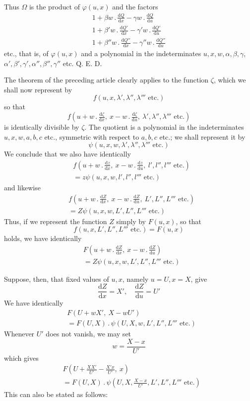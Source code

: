 Thus $\Omega$ is the product of $\varphi(u,x)$ and the factors
\[
\begin{gathered}
1+\beta w\, .\,\frac{\mathrm dQ}{\mathrm dx}-\gamma w\, .\,\frac{\mathrm dQ}{\mathrm du}\\
1+\beta'w\, .\,\frac{\mathrm dQ'}{\mathrm dx}-\gamma'w\, .\,\frac{\mathrm dQ'}{\mathrm du}\\
1+\beta''w\, .\,\frac{\mathrm dQ''}{\mathrm dx}-\gamma''w\, .\,\frac{\mathrm dQ''}{\mathrm du}
\end{gathered}
\]
etc., that is, of $\varphi(u,x)$ and a polynomial in the indeterminates $u,x,w,\alpha,\beta,\gamma$, $\alpha',\beta',\gamma',\alpha'',\beta'',\gamma''$ etc. Q. E. D.

The theorem of the preceding article clearly applies to the function $\zeta$, which we shall now represent by
\[
f(u,x,\lambda',\lambda'',\lambda'''\text{ etc.})
\]
so that
\[
f(u+w\, .\,\tfrac{\mathrm d\zeta}{\mathrm dx},\ x-w\, .\,\tfrac{\mathrm d\zeta}{\mathrm du},\ \lambda',\lambda'',\lambda'''\text{ etc.})
\]
is identically divisible by $\zeta$. The quotient is a polynomial in the indeterminates $u,x,w,a,b,c$ etc., symmetric with respect to $a,b,c$ etc.; we shall represent it by
\[
\psi(u,x,w,\lambda',\lambda'',\lambda'''\text{ etc.})
\]
We conclude that we also have identically
\[
\begin{aligned}
&f(u+w\, .\,\tfrac{\mathrm dz}{\mathrm dx},\ x-w\, .\,\tfrac{\mathrm dz}{\mathrm du},\ l',l'',l'''\text{ etc.})\\
&=z\psi(u,x,w,l',l'',l'''\text{ etc.})
\end{aligned}
\]
and likewise
\[
\begin{aligned}
&f(u+w\, .\,\tfrac{\mathrm dZ}{\mathrm dx},\ x-w\, .\,\tfrac{\mathrm dZ}{\mathrm du},\ L',L'',L'''\text{ etc.})\\
&=Z\psi(u,x,w,L',L'',L'''\text{ etc.})
\end{aligned}
\]
Thus, if we represent the function $Z$ simply by $F(u,x)$, so that
\[
f(u,x,L',L'',L'''\text{ etc.})=F(u,x)
\]
holds, we have identically
\[
\begin{aligned}
&F(u+w\, .\,\tfrac{\mathrm dZ}{\mathrm dx},\ x-w\, .\,\tfrac{\mathrm dZ}{\mathrm du})\\
&=Z\psi(u,x,w,L',L'',L'''\text{ etc.})
\end{aligned}
\]

Suppose, then, that fixed values of $u,x$, namely $u=U,x=X$, give
\[
\frac{\mathrm dZ}{\mathrm dx}=X',\quad\frac{\mathrm dZ}{\mathrm du}=U'
\]
We have identically
\[
\begin{aligned}
&F(U+wX',\ X-wU')\\
&=F(U,X)\, .\,\psi(U,X,w,L',L'',L'''\text{ etc.})
\end{aligned}
\]
Whenever $U'$ does not vanish, we may set
\[
w=\frac{X-x}{U'}
\]
which gives
\[
\begin{aligned}
&F(U+\tfrac{XX'}{U'}-\tfrac{X'x}{U'},\ x)\\
&=F(U,X)\, .\,\psi(U,X,\tfrac{X-x}{U'},L',L'',L'''\text{ etc.})
\end{aligned}
\]
This can also be stated as follows:

